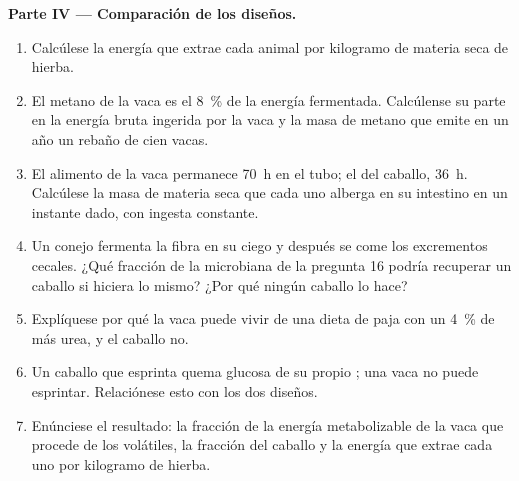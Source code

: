 \begin{problem}
\medskip
\noindent\textbf{Parte IV --- Comparación de los diseños.}
\begin{enumerate}[resume]
  \item Calcúlese la energía que extrae cada animal por kilogramo de materia
        seca de hierba.
  \item El metano de la vaca es el \qty{8}{\%} de la energía fermentada.
        Calcúlense su parte en la energía bruta ingerida por la vaca y la
        masa de metano que emite en un año un rebaño de cien vacas.
  \item El alimento de la vaca permanece \qty{70}{h} en el tubo; el del
        caballo, \qty{36}{h}. Calcúlese la masa de materia seca que cada uno
        alberga en su intestino en un instante dado, con ingesta constante.
  \item Un conejo fermenta la fibra en su ciego y después se come los
        excrementos cecales. ¿Qué fracción de la  microbiana de la
        pregunta 16 podría recuperar un caballo si hiciera lo mismo? ¿Por
        qué ningún caballo lo hace?
  \item Explíquese por qué la vaca puede vivir de una dieta de paja con un
        \qty{4}{\%} de  más urea, y el caballo no.
  \item Un caballo que esprinta quema glucosa de su propio ; una
        vaca no puede esprintar. Relaciónese esto con los dos diseños.
  \item Enúnciese el resultado: la fracción de la energía metabolizable de
        la vaca que procede de los  volátiles, la fracción del
        caballo y la energía que extrae cada uno por kilogramo de hierba.
\end{enumerate}
\end{problem}

